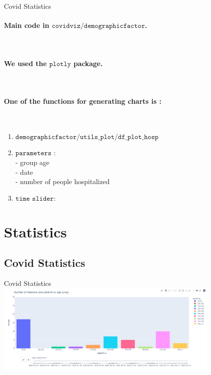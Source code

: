 \documentclass[11pt, compress, tikz, xcolor=table]{beamer}
\theoremstyle{definition}
\begin{document}
\begin{frame}[fragile]{Covid Statistics} 

\paragraph{Main code in $\texttt{covidviz/demographicfactor}$.}\\

\paragraph{We used the $\texttt{plotly}$ package.}\\

\paragraph{One of the functions for generating charts is :}\\
 \begin{enumerate}
    \item $\texttt{demographicfactor/utils\_plot/df\_plot\_hosp}$
    \item $\texttt{parameters :}$\\
        - group age\\
        - date\\
        - number of people hospitalized\\
    \item $\texttt{time slider:}$\\

    
\end{enumerate}

\end{frame}

\section{Statistics}

\subsection{Covid Statistics}
\begin{frame}[fragile]{Covid Statistics}
      \includegraphics[width=11cm]{images/Capture_age.PNG}
      
\end{frame}
\end{document}
